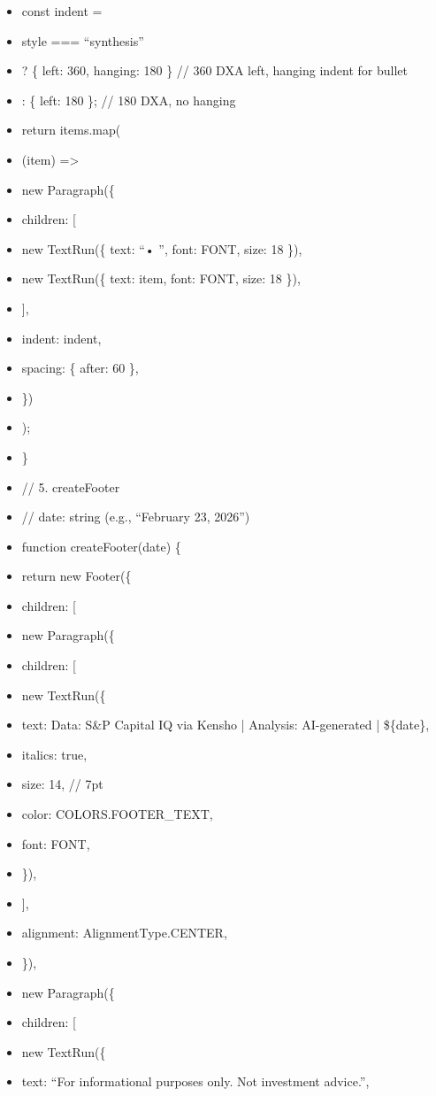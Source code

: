 \documentclass[11pt]{article}
\begin{document}
\begin{itemize}[leftmargin=*,itemsep=2pt,topsep=2pt]
\item {} const indent =
\item {} style === ``synthesis''
\item {} ? \{ left: 360, hanging: 180 \} // 360 DXA left, hanging indent for bullet
\item {} : \{ left: 180 \}; // 180 DXA, no hanging
\item {} return items.map(
\item {} (item) =>
\item {} new Paragraph(\{
\item {} children: [
\item {} new TextRun(\{ text: ``• '', font: FONT, size: 18 \}),
\item {} new TextRun(\{ text: item, font: FONT, size: 18 \}),
\item {} ],
\item {} indent: indent,
\item {} spacing: \{ after: 60 \},
\item {} \})
\item {} );
\item {} \}
\item {} // 5. createFooter
\item {} // date: string (e.g., ``February 23, 2026'')
\item {} function createFooter(date) \{
\item {} return new Footer(\{
\item {} children: [
\item {} new Paragraph(\{
\item {} children: [
\item {} new TextRun(\{
\item {} text: Data: S\&P Capital IQ via Kensho | Analysis: AI-generated | \$\{date\},
\item {} italics: true,
\item {} size: 14, // 7pt
\item {} color: COLORS.FOOTER\_\allowbreak{}TEXT,
\item {} font: FONT,
\item {} \}),
\item {} ],
\item {} alignment: AlignmentType.CENTER,
\item {} \}),
\item {} new Paragraph(\{
\item {} children: [
\item {} new TextRun(\{
\item {} text: ``For informational purposes only. Not investment advice.'',

\end{itemize}
\end{document}
